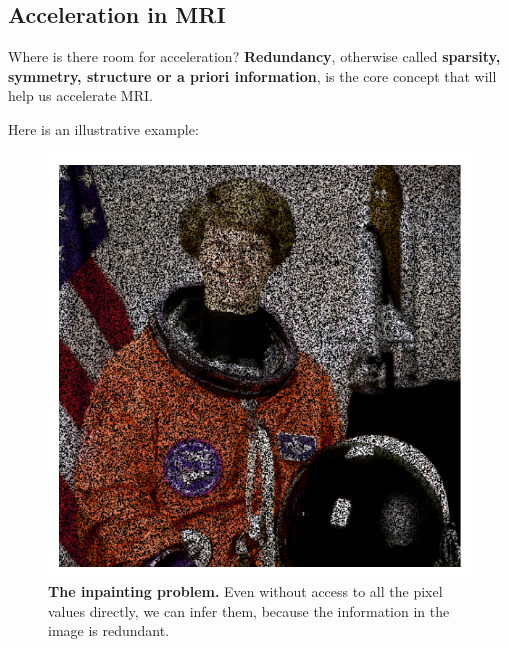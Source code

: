 \subsection{Acceleration in MRI}
\begin{frame}{Where is there room for acceleration?}
    \textbf{Redundancy}, otherwise called \textbf{sparsity, symmetry, structure or a priori information}, is the core concept that will help us accelerate MRI.\\
    
    \begin{overprint}
        \hfill \break
    Here is an illustrative example:
    \begin{figure}
        \centering
        \includegraphics[height=0.4\textheight]{Figures/intro_figures/astronaut_masked.pdf}
        \caption{\label{fig:astronaut-masked}\textbf{The inpainting problem.} Even without access to all the pixel values directly, we can infer them, because the information in the image is redundant.
        }
    \end{figure}
    

\end{overprint}
\end{frame}
